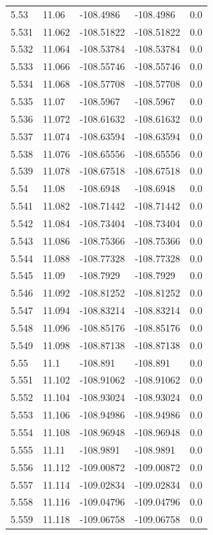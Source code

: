 \begin{tabular}{lllll}
5.53 & 11.06 & -108.4986 & -108.4986 & 0.0 \\
5.531 & 11.062 & -108.51822 & -108.51822 & 0.0 \\
5.532 & 11.064 & -108.53784 & -108.53784 & 0.0 \\
5.533 & 11.066 & -108.55746 & -108.55746 & 0.0 \\
5.534 & 11.068 & -108.57708 & -108.57708 & 0.0 \\
5.535 & 11.07 & -108.5967 & -108.5967 & 0.0 \\
5.536 & 11.072 & -108.61632 & -108.61632 & 0.0 \\
5.537 & 11.074 & -108.63594 & -108.63594 & 0.0 \\
5.538 & 11.076 & -108.65556 & -108.65556 & 0.0 \\
5.539 & 11.078 & -108.67518 & -108.67518 & 0.0 \\
5.54 & 11.08 & -108.6948 & -108.6948 & 0.0 \\
5.541 & 11.082 & -108.71442 & -108.71442 & 0.0 \\
5.542 & 11.084 & -108.73404 & -108.73404 & 0.0 \\
5.543 & 11.086 & -108.75366 & -108.75366 & 0.0 \\
5.544 & 11.088 & -108.77328 & -108.77328 & 0.0 \\
5.545 & 11.09 & -108.7929 & -108.7929 & 0.0 \\
5.546 & 11.092 & -108.81252 & -108.81252 & 0.0 \\
5.547 & 11.094 & -108.83214 & -108.83214 & 0.0 \\
5.548 & 11.096 & -108.85176 & -108.85176 & 0.0 \\
5.549 & 11.098 & -108.87138 & -108.87138 & 0.0 \\
5.55 & 11.1 & -108.891 & -108.891 & 0.0 \\
5.551 & 11.102 & -108.91062 & -108.91062 & 0.0 \\
5.552 & 11.104 & -108.93024 & -108.93024 & 0.0 \\
5.553 & 11.106 & -108.94986 & -108.94986 & 0.0 \\
5.554 & 11.108 & -108.96948 & -108.96948 & 0.0 \\
5.555 & 11.11 & -108.9891 & -108.9891 & 0.0 \\
5.556 & 11.112 & -109.00872 & -109.00872 & 0.0 \\
5.557 & 11.114 & -109.02834 & -109.02834 & 0.0 \\
5.558 & 11.116 & -109.04796 & -109.04796 & 0.0 \\
5.559 & 11.118 & -109.06758 & -109.06758 & 0.0 \\

\end{tabular}
